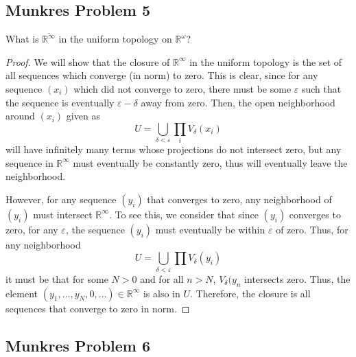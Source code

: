\documentclass[fontsize=11pt]{scrartcl} %
\numberwithin{equation}{section} %
\numberwithin{figure}{section} %
\numberwithin{table}{section} %
\newcommand{\R}{\mathbb{R}}
\begin{document}
\subsection*{Munkres Problem 5}
What is $\overline{\R^{\infty}}$ in the uniform topology on $\R^{\omega}$?
\\
\begin{proof}
    We will show that the closure of $\R^{\infty}$ in the uniform topology
    is the set of all sequences which converge (in norm) to zero. This is clear,
    since for any sequence $(x_i)$ which did not converge to zero, there must be some
    $\varepsilon$ such that the sequence is eventually $\varepsilon - \delta$ away from
    zero.
    Then, the open neighborhood around $(x_i)$ given as
    \[
        U = \bigcup_{\delta<\varepsilon}\prod_i V_{\delta}(x_i)
    \]
    will have infinitely many terms whose projections do not intersect zero,
    but any sequence in $\R^{\infty}$ must eventually be constantly zero, thus
    will eventually leave the neighborhood.

    However, for any sequence $(y_i)$ that converges to zero, any neighborhood
    of $(y_i)$ must intersect $\R^{\infty}$. To see this, we consider that
    since $(y_i)$ converges to zero, for any $\varepsilon$, the sequence
    $(y_i)$ must eventually be within $\varepsilon$ of zero. Thus, for any
    neighborhood
    \[
        U = \bigcup_{\delta<\varepsilon}\prod V_{\delta}(y_i)
    \]
    it must be that for some $N>0$ and for all $n>N$, $V_{\delta}(y_n$
    intersects zero. Thus, the element $(y_1,\ldots,y_N,0,\ldots)\in\R^{\infty}$
    is also in $U$.
    Therefore, the closure is all sequences that converge to zero in norm.
\end{proof}
\subsection*{Munkres Problem 6}

\pagebreak

\pagebreak

\pagebreak

\pagebreak
\end{document}
